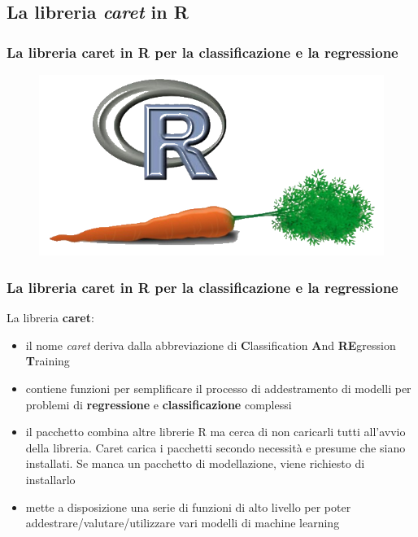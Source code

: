 \subsection[La libreria \textit{caret} in R]{La libreria \textit{caret} in R}


\begin{frame}
	
	\frametitle{La libreria \textbf{caret} in R per la classificazione e la regressione}
	
	\begin{figure}[!htbp]
		\centering
		\includegraphics[width=0.85\linewidth]{images/supervised/coding/caret.png}
		
	\end{figure}
	
\end{frame}



\begin{frame}
	
	\frametitle{La libreria \textbf{caret} in R per la classificazione e la regressione}
	
		La libreria \textbf{caret}:
		\begin{itemize}
			\item il nome \textit{caret} deriva dalla abbreviazione di \textbf{C}lassification \textbf{A}nd \textbf{RE}gression \textbf{T}raining
			\pause
			\item contiene funzioni per semplificare il processo di addestramento di modelli per problemi di \textbf{regressione} e \textbf{classificazione} complessi
			\pause
			\item il pacchetto combina altre librerie R ma cerca di non caricarli tutti all'avvio della libreria. Caret carica i pacchetti secondo necessità e presume che siano installati. Se manca un pacchetto di modellazione, viene richiesto di installarlo
			\pause
			\item mette a disposizione una serie di funzioni di alto livello per poter addestrare/valutare/utilizzare vari modelli di machine learning
		\end{itemize}

\end{frame}


